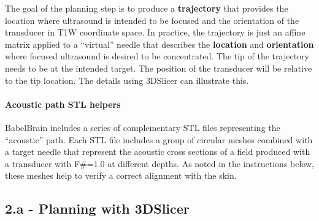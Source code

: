 The goal of the planning step is to produce a \textbf{trajectory} that
provides the location where ultrasound is intended to be focused and the
orientation of the transducer in T1W coordinate space. In practice, the
trajectory is just an affine matrix applied to a ``virtual'' needle that
describes the \textbf{location} and \textbf{orientation} where focused
ultrasound is desired to be concentrated. The tip of the trajectory
needs to be at the intended target. The position of the transducer will
be relative to the tip location. The details using 3DSlicer can
illustrate this.

\hypertarget{acoustic-path-stl-helpers}{%
\paragraph{Acoustic path STL helpers}\label{acoustic-path-stl-helpers}}

BabelBrain includes a series of complementary STL files representing the
``acoustic'' path. Each STL file includes a group of circular meshes
combined with a target needle that represent the acoustic cross sections
of a field produced with a transducer with F\#=1.0 at different depths.
As noted in the instructions below, these meshes help to verify a
correct alignment with the skin.

\hypertarget{a---planning-with-3dslicer}{%
\subsection{2.a - Planning with
3DSlicer}\label{a---planning-with-3dslicer}}

